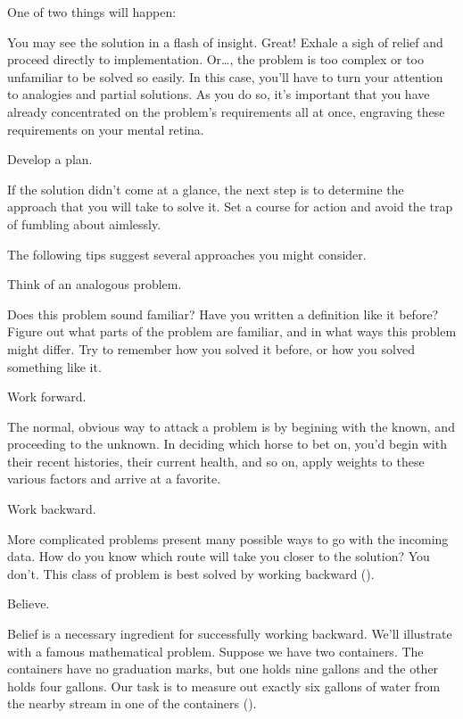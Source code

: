 One of two things will happen:

You may see the solution in a flash of insight. Great! Exhale a sigh
of relief and proceed directly to implementation. Or\dots{}, the problem is
too complex or too unfamiliar to be solved so easily. In this case, you'll
have to turn your attention to analogies and partial solutions. As you do
so, it's important that you have already concentrated on the problem's
requirements all at once, engraving these requirements on your mental
retina.

\begin{tip}
Develop a plan.
\end{tip}
If the solution didn't come at a glance, the next step is to determine the
approach that you will take to solve it. Set a course for action and avoid
the trap of fumbling about aimlessly.

The following tips suggest several approaches you might consider.

\begin{tip}
Think of an analogous problem.
\end{tip}
Does this problem sound familiar? Have you written a definition like it
before? Figure out what parts of the problem are familiar, and in what
ways this problem might differ. Try to remember how you solved it
before, or how you solved something like it.

\begin{tip}
Work forward.
\end{tip}
The normal, obvious way to attack a problem is by begining with the
known, and proceeding to the unknown. In deciding which horse to bet
on, you'd begin with their recent histories, their current health, and so on,
apply weights to these various factors and arrive at a favorite.

\begin{tip}
Work backward.
\end{tip}
More complicated problems present many possible ways to go with the
incoming data. How do you know which route will take you closer to the
solution? You don't. This class of problem is best solved by working
backward ().



\begin{tip}
Believe.
\end{tip}
Belief is a necessary ingredient for successfully working backward. We'll
illustrate with a famous mathematical problem. Suppose we have two
containers. The containers have no graduation marks, but one holds nine
gallons and the other holds four gallons. Our task is to measure out exactly
six gallons of water from the nearby stream in one of the containers
().

